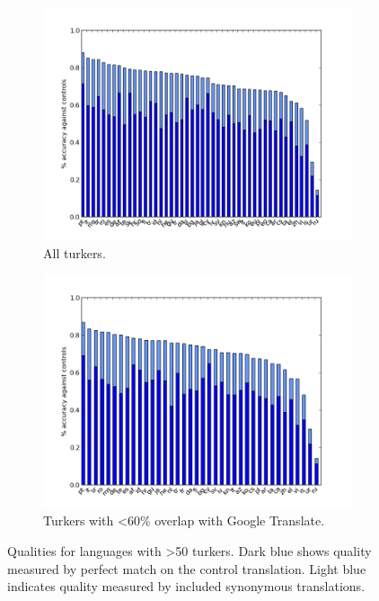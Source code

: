 \documentclass[11pt]{article}
\begin{document}
\begin{figure}
\centering
\begin{subfigure}[b]{1\linewidth}
\includegraphics[width=\textwidth]{figures/fig2with.png}
\caption{All turkers.}                
\label{dist}
\end{subfigure}
\begin{subfigure}[b]{1\linewidth}
\includegraphics[width=\textwidth]{figures/fig2without.png}
\caption{Turkers with \textless 60\% overlap with Google Translate.}
\label{cdf}
\end{subfigure}
\caption{Qualities for languages with \textgreater 50 turkers. Dark blue shows quality measured by perfect match on the control translation. Light blue indicates quality measured by included synonymous translations.}\label{qual}
\end{figure}
\end{document}
